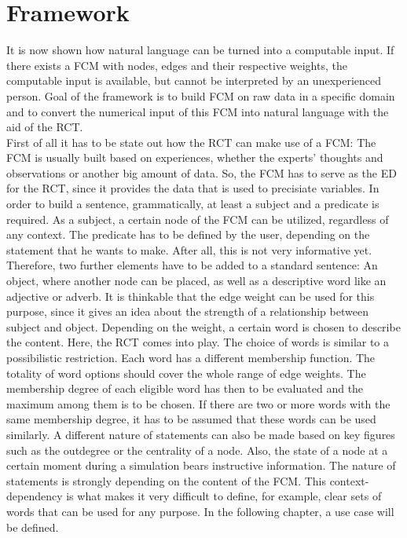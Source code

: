 \documentclass[conference]{IEEEtran}
\begin{document}
\section{Framework}
It is now shown how natural language can be turned into a computable input. If there exists a FCM with nodes, edges and their respective weights, the computable input is available, but cannot be interpreted by an unexperienced person. Goal of the framework is to build FCM on raw data in a specific domain and to convert the numerical input of this FCM into natural language with the aid of the RCT.\\
First of all it has to be state out how the RCT can make use of a FCM: The FCM is usually built based on experiences, whether the experts' thoughts and observations or another big amount of data. So, the FCM has to serve as the ED for the RCT, since it provides the data that is used to precisiate variables.
In order to build a sentence, grammatically, at least a subject and a predicate is required. As a subject, a certain node of the FCM can be utilized, regardless of any context. The predicate has to be defined by the user, depending on the statement that he wants to make. After all, this is not very informative yet.
Therefore, two further elements have to be added to a standard sentence: An object, where another node can be placed, as well as a descriptive word like an adjective or adverb. It is thinkable that the edge weight can be used for this purpose, since it gives an idea about the strength of a relationship between subject and object. Depending on the weight, a certain word is chosen to describe the content.
Here, the RCT comes into play. The choice of words is similar to a possibilistic restriction. Each word has a different membership function. The totality of word options should cover the whole range of edge weights. The membership degree of each eligible word has then to be evaluated and the maximum among them is to be chosen. If there are two or more words with the same membership degree, it has to be assumed that these words can be used similarly.
A different nature of statements can also be made based on key figures such as the outdegree or the centrality of a node. Also, the state of a node at a certain moment during a simulation bears instructive information.
The nature of statements is strongly depending on the content of the FCM. This context-dependency is what makes it very difficult to define, for example, clear sets of words that can be used for any purpose. In the following chapter, a use case will be defined.
\end{document}

